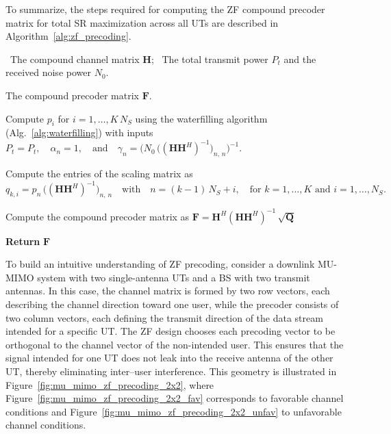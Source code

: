 To summarize, the steps required for computing the \ac{ZF} compound precoder matrix for total \ac{SR} maximization across all \acp{UT} are described in Algorithm~\ref{alg:zf_precoding}.
\begin{algorithm}[!htbp]
\caption{\ac{ZF} Precoding}
\label{alg:zf_precoding}
\begin{algorithmic}[1]
    
    \Require 
    \Statex \hspace{-\algorithmicindent} \textbullet \, The compound channel matrix $\mathbf{H}$;
    \Statex \hspace{-\algorithmicindent} \textbullet \, The total transmit power $P_t$ and the received noise power $N_0$.
    
    \Ensure  The compound precoder matrix $\mathbf{F}$.

    \medskip
    \State Compute $p_i$ for $i = 1, \dots, K\,N_S$ using the waterfilling algorithm (Alg.~\ref{alg:waterfilling}) with inputs
    \Statex $P_t = P_t, \quad \alpha_n = 1, \quad \text{and} \quad  \gamma_n = \big(N_0 \, \big((\mathbf{H} \mathbf{H}^H)^{-1}\big)_{n,\,n}\big)^{-1}.$
    
    \vspace{0.4\baselineskip}
    \State Compute the entries of the scaling matrix as
    \Statex $q_{k, i} = p_n \, \big((\mathbf{H} \mathbf{H}^H)^{-1}\big)_{n,\,n} \quad \text{with} \quad n = (k-1)\,N_S + i, \quad \text{for  } k = 1, \dots, K \text{  and  } i = 1, \dots, N_S.$

    \vspace{0.4\baselineskip}
    \State Compute the compound precoder matrix as
    \Statex $\mathbf{F} = \mathbf{H}^H (\mathbf{H} \mathbf{H}^H)^{-1} \, \sqrt{\mathbf{Q}}$

    \medskip
    \Statex \hspace{-\algorithmicindent}\textbf{Return} \; $\mathbf{F}$

\end{algorithmic}
\end{algorithm}


To build an intuitive understanding of \ac{ZF} precoding, consider a downlink \ac{MU}-\ac{MIMO} system with two single-antenna \acp{UT} and a \ac{BS} with two transmit antennas.
In this case, the channel matrix is formed by two row vectors, each describing the channel direction toward one user, while the precoder consists of two column vectors, each defining the transmit direction of the data stream intended for a specific \ac{UT}.
The \ac{ZF} design chooses each precoding vector to be orthogonal to the channel vector of the non-intended user.
This ensures that the signal intended for one \ac{UT} does not leak into the receive antenna of the other \ac{UT}, thereby eliminating inter--user interference.
This geometry is illustrated in Figure~\ref{fig:mu_mimo_zf_precoding_2x2}, where Figure~\ref{fig:mu_mimo_zf_precoding_2x2_fav} corresponds to favorable channel conditions and Figure~\ref{fig:mu_mimo_zf_precoding_2x2_unfav} to unfavorable channel conditions.

